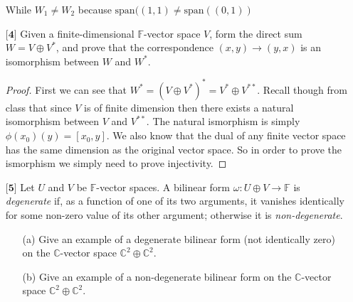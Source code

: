 \documentclass[12pt]{article}
\begin{document}
\begin{itemize}
        While $W_1 \neq W_2$ because $\text{span}((1,1) \neq \text{span}((0,1))$

    
    
    \vspace{.5cm}
    \item[$\textbf{[4]}$]
    Given a finite-dimensional $\mathbb{F}$-vector space $V$, form the direct sum $W = V \oplus V^*$, and prove that the correspondence $(x,y) \rightarrow (y,x)$ is an isomorphism between $W$ and $W^*$. 

    \begin{proof}
        First we can see that $W^* = (V\oplus V^*)^* = V^* \oplus V^{**}$. Recall though from class that since $V$ is of finite dimension then there exists a natural isomorphism between $V$ and $V^{**}$. The natural ismorphism is simply $\phi(x_0)(y) = [x_0,y]$. We also know that the dual of any finite vector space has the same dimension as the original vector space. So in order to prove the ismorphism we simply need to prove injectivity. 

        
    \end{proof}
    
    \vspace{.5cm}
    \item[$\textbf{[5]}$]
    Let $U$ and $V$ be $\mathbb{F}$-vector spaces. A bilinear form $\omega: U \oplus V \rightarrow \mathbb{F}$ is \textit{degenerate} if, as a function of one of its two arguments, it vanishes identically for some non-zero value of its other argument; otherwise it is \textit{non-degenerate}.
    \begin{itemize}
    
    \vspace{.3cm}
    \item[(a)]
    Give an example of a degenerate bilinear form (not identically zero) on the $\mathbb{C}$-vector space $\mathbb{C}^2 \oplus \mathbb{C}^2$.
    
    \vspace{.3cm}
    \item[(b)]
    Give an example of a non-degenerate bilinear form on the $\mathbb{C}$-vector space $\mathbb{C}^2 \oplus \mathbb{C}^2$.  
    
    \end{itemize}
    

\end{itemize}
\end{document}
